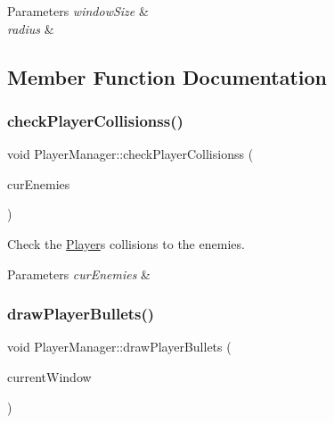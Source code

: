 \begin{DoxyParams}{Parameters}
{\em window\+Size} & \\
\hline
{\em radius} & \\
\hline
\end{DoxyParams}


\subsection{Member Function Documentation}
\mbox{\label{class_player_manager_ac4bad97c7d281a47a876d7cee5f864bd}} 
\subsubsection{\texorpdfstring{check\+Player\+Collisionss()}{checkPlayerCollisionss()}}
{\footnotesize\ttfamily void Player\+Manager\+::check\+Player\+Collisionss (\begin{DoxyParamCaption}\item[{std\+::vector$<$ \hyperlink{class_enemy}{Enemy} $>$ \&}]{cur\+Enemies }\end{DoxyParamCaption})}



Check the \hyperlink{class_player}{Player}\textquotesingle{}s collisions to the enemies. 


\begin{DoxyParams}{Parameters}
{\em cur\+Enemies} & \\
\hline
\end{DoxyParams}
\mbox{\label{class_player_manager_a503d878624b53851c6fa25559630f544}} 
\subsubsection{\texorpdfstring{draw\+Player\+Bullets()}{drawPlayerBullets()}}
{\footnotesize\ttfamily void Player\+Manager\+::draw\+Player\+Bullets (\begin{DoxyParamCaption}\item[{sf\+::\+Render\+Window $\ast$}]{current\+Window }\end{DoxyParamCaption})}



